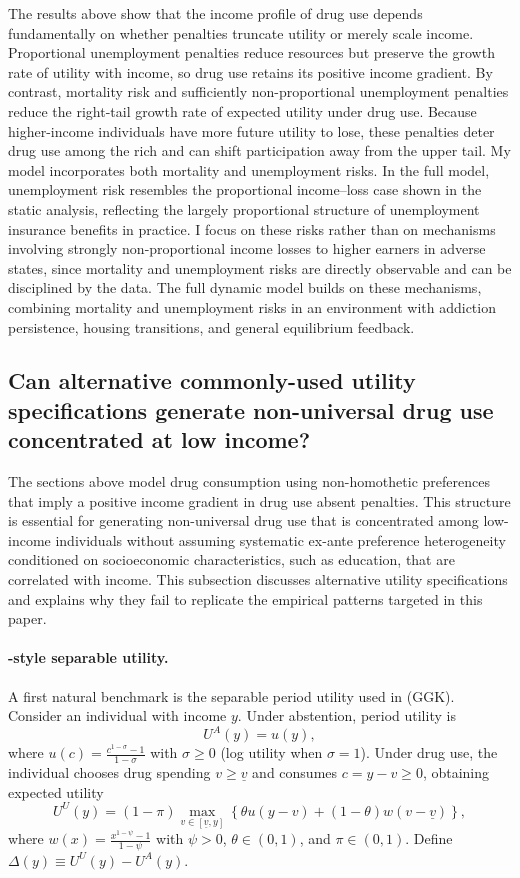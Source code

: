 The results above show that the income profile of drug use depends fundamentally on whether penalties truncate utility or merely scale income. Proportional unemployment penalties reduce resources but preserve the growth rate of utility with income, so drug use retains its positive income gradient. By contrast, mortality risk and sufficiently non-proportional unemployment penalties reduce the right-tail growth rate of expected utility under drug use. Because higher-income individuals have more future utility to lose, these penalties deter drug use among the rich and can shift participation away from the upper tail. My model incorporates both mortality and unemployment risks. In the full model, unemployment risk resembles the proportional income--loss case shown in the static analysis, reflecting the largely proportional structure of unemployment insurance benefits in practice. I focus on these risks rather than on mechanisms involving strongly non-proportional income losses to higher earners in adverse states, since mortality and unemployment risks are directly observable and can be disciplined by the data. The full dynamic model builds on these mechanisms, combining mortality and unemployment risks in an 
environment with addiction persistence, housing transitions, and general equilibrium feedback.

\subsection{Can alternative commonly-used utility specifications generate non-universal drug use concentrated at low income?}

The sections above model drug consumption using non-homothetic preferences that imply a positive income gradient in drug use absent penalties. This structure is essential for generating non-universal drug use that is concentrated among low-income individuals without assuming systematic ex-ante preference heterogeneity conditioned on socioeconomic characteristics, such as education, that are correlated with income. This subsection discusses alternative utility specifications and explains why they fail to replicate the empirical patterns targeted in this paper.

\paragraph{\citet{greenwood_guner_kopecky_2025_downward_spiral}-style separable utility.}
A first natural benchmark is the separable period utility used in \citet{greenwood_guner_kopecky_2025_downward_spiral} (GGK). Consider an individual with income $y$. Under abstention, period utility is
\[
U^{A}(y)=u(y),
\]
where $u(c)=\frac{c^{1-\sigma}-1}{1-\sigma}$ with $\sigma\ge 0$ (log utility when $\sigma=1$). Under drug use, the individual chooses drug spending $v\ge \underline v$ and consumes $c=y-v\ge 0$, obtaining expected utility
\[
U^{U}(y)=(1-\pi)\max_{v\in[\underline v,y]}\left\{\theta u(y-v)+(1-\theta) w(v-\underline v)\right\},
\]
where $w(x)=\frac{x^{1-\psi}-1}{1-\psi}$ with $\psi>0$, $\theta\in(0,1)$, and $\pi\in(0,1)$. Define $\Delta(y)\equiv U^{U}(y)-U^{A}(y)$.

